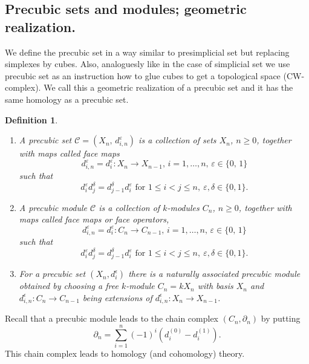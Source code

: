 \documentclass[12pt]{amsart}
\newtheorem{definition}[theorem]{Definition}
\begin{document}
\subsection{Precubic sets and modules; geometric realization. }

We define the precubic set in a way similar to presimplicial set but replacing simplexes by cubes. Also, analoguesly like in the case of simplicial set we use precubic set as an instruction how to glue cubes to get a topological space (CW-complex). We call this a geometric realization of a precubic set and it has the same homology as a precubic set.

\begin{definition}\label{precubic}
\begin{enumerate}
\item[(1)] A precubic set ${\mathcal C}=(X_n,\,d_{i,n}^{\varepsilon})$ is 
a collection of sets $X_n$, $n\geq 0$, together  with maps called face maps
\begin{equation*}
d_{i,n}^{\varepsilon} = d_{i}^{\varepsilon}: X_n\to X_{n-1},\, i = 1,\ldots, n,\, \varepsilon \in\{0,\,1\}
\end{equation*}
such that 
\begin{equation*}
d_i^{\varepsilon}d_j^{\delta}= d_{j-1}^{\delta}d_i^{\varepsilon} \mbox{ for } 1\leq i < j \leq n,\ \varepsilon,\delta \in \{0,1\}.
\end{equation*}
\item[(2)] A precubic module $\mathcal C$ is a collection of $k$-modules $C_{n}$, $n \geq 0$, together with maps called face maps or face operators,
\begin{equation*}
d_{i,n}^{\varepsilon}=d_{i}^{\varepsilon}: C_{n} \to C_{n-1},\, i = 1,\ldots, n,\, \varepsilon\in \{0,\,1\}  
\end{equation*}
such that
\begin{equation*}
d_i^{\varepsilon}d_j^{\delta} = d_{j-1}^{\delta}d_i^{\varepsilon} \mbox{ for } 1 \leq i<j \leq n, \ \varepsilon,\delta \in \{0,1\}.  
\end{equation*}
\item[(3)] For a precubic set $(X_{n},d_{i}^{\epsilon })$ there is a naturally associated precubic module obtained by choosing a free $k$-module $C_{n}=kX_{n}$ with basis $X_{n}$ and $d_{i,n}^{\epsilon }:C_{n}\rightarrow C_{n-1}$ being extensions of $d_{i,n}^{\epsilon }:X_{n}\rightarrow X_{n-1}$.
\end{enumerate}
\end{definition}
Recall that a precubic module leads to the chain complex $(C_n,\partial_n)$ by putting 
\begin{equation*}
\partial_n=\sum_{i=1}^n(-1)^i(d_i^{(0)}-d_i^{(1)}).    
\end{equation*}
This chain complex leads to homology (and cohomology) theory.
\end{document}
